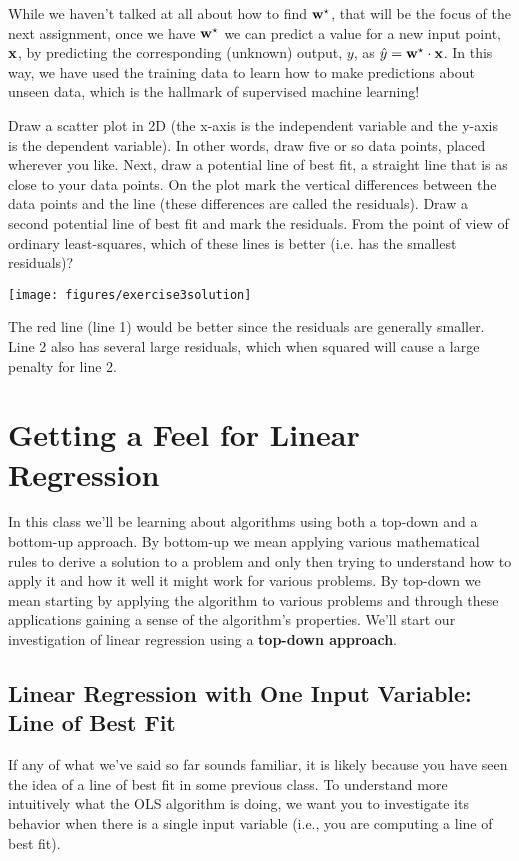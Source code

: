 \documentclass[assignment01_Solutions]{subfiles}
\begin{document}
While we haven't talked at all about how to find $\mathbf{w}^\star$, that will be the focus of the next assignment, once we have $\mathbf{w}^\star$ we can predict a value for a new input point, $\mathbf{x}$, by predicting the corresponding (unknown) output, $y$, as $\hat{y} = \mathbf{w^\star} \cdot \mathbf{x}$.  In this way, we have used the training data to learn how to make predictions about unseen data, which is the hallmark of supervised machine learning!

\begin{exercise}
Draw a scatter plot in 2D (the x-axis is the independent variable and the y-axis is the dependent variable).  In other words, draw five or so data points, placed wherever you like. Next, draw a potential line of best fit, a straight line that is as close to your data points.  On the plot mark the vertical differences between the data points and the line (these differences are called the residuals).  Draw a second potential line of best fit and mark the residuals.  From the point of view of ordinary least-squares, which of these lines is better (i.e. has the smallest residuals)?

\begin{boxedsolution}
\begin{center}
\texttt{[image: figures/exercise3solution]}
\end{center}

The red line (line 1) would be better since the residuals are generally smaller.  Line 2 also has several large residuals, which when squared will cause a large penalty for line 2.
\end{boxedsolution}
\end{exercise}

\section{Getting a Feel for Linear Regression}
In this class we'll be learning about algorithms using both a top-down and a bottom-up approach.  By bottom-up we mean applying various mathematical rules to derive a solution to a problem and only then trying to understand how to apply it and how it well it might work for various problems.  By top-down we mean starting by applying the algorithm to various problems and through these applications gaining a sense of the algorithm's properties.  We'll start our investigation of linear regression using a \textbf{top-down approach}.


\subsection{Linear Regression with One Input Variable: Line of Best Fit}
If any of what we've said so far sounds familiar, it is likely because you have seen the idea of a line of best fit in some previous class.  To understand more intuitively what the OLS algorithm is doing, we want you to investigate its behavior when there is a single input variable (i.e., you are computing a line of best fit).  
\end{document}
